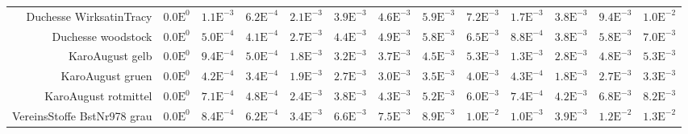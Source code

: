 \begin{landscape}
\begin{table}
\begin{tabularx}{\linewidth}{r | rr | rrrrrr | rrrr}
        Duchesse WirksatinTracy & \footnotesize{$0.0\mathrm{E}^{0}$}& \footnotesize{$1.1\mathrm{E}^{-3}$}& \footnotesize{$6.2\mathrm{E}^{-4}$}& \footnotesize{$2.1\mathrm{E}^{-3}$}& \footnotesize{$3.9\mathrm{E}^{-3}$}& \footnotesize{$4.6\mathrm{E}^{-3}$}& \footnotesize{$5.9\mathrm{E}^{-3}$}& \footnotesize{$7.2\mathrm{E}^{-3}$}& \footnotesize{$1.7\mathrm{E}^{-3}$}& \footnotesize{$3.8\mathrm{E}^{-3}$}& \footnotesize{$9.4\mathrm{E}^{-3}$}& \footnotesize{$1.0\mathrm{E}^{-2}$}\\
        Duchesse woodstock & \footnotesize{$0.0\mathrm{E}^{0}$}& \footnotesize{$5.0\mathrm{E}^{-4}$}& \footnotesize{$4.1\mathrm{E}^{-4}$}& \footnotesize{$2.7\mathrm{E}^{-3}$}& \footnotesize{$4.4\mathrm{E}^{-3}$}& \footnotesize{$4.9\mathrm{E}^{-3}$}& \footnotesize{$5.8\mathrm{E}^{-3}$}& \footnotesize{$6.5\mathrm{E}^{-3}$}& \footnotesize{$8.8\mathrm{E}^{-4}$}& \footnotesize{$3.8\mathrm{E}^{-3}$}& \footnotesize{$5.8\mathrm{E}^{-3}$}& \footnotesize{$7.0\mathrm{E}^{-3}$}\\
        KaroAugust gelb & \footnotesize{$0.0\mathrm{E}^{0}$}& \footnotesize{$9.4\mathrm{E}^{-4}$}& \footnotesize{$5.0\mathrm{E}^{-4}$}& \footnotesize{$1.8\mathrm{E}^{-3}$}& \footnotesize{$3.2\mathrm{E}^{-3}$}& \footnotesize{$3.7\mathrm{E}^{-3}$}& \footnotesize{$4.5\mathrm{E}^{-3}$}& \footnotesize{$5.3\mathrm{E}^{-3}$}& \footnotesize{$1.3\mathrm{E}^{-3}$}& \footnotesize{$2.8\mathrm{E}^{-3}$}& \footnotesize{$4.8\mathrm{E}^{-3}$}& \footnotesize{$5.3\mathrm{E}^{-3}$}\\
        KaroAugust gruen & \footnotesize{$0.0\mathrm{E}^{0}$}& \footnotesize{$4.2\mathrm{E}^{-4}$}& \footnotesize{$3.4\mathrm{E}^{-4}$}& \footnotesize{$1.9\mathrm{E}^{-3}$}& \footnotesize{$2.7\mathrm{E}^{-3}$}& \footnotesize{$3.0\mathrm{E}^{-3}$}& \footnotesize{$3.5\mathrm{E}^{-3}$}& \footnotesize{$4.0\mathrm{E}^{-3}$}& \footnotesize{$4.3\mathrm{E}^{-4}$}& \footnotesize{$1.8\mathrm{E}^{-3}$}& \footnotesize{$2.7\mathrm{E}^{-3}$}& \footnotesize{$3.3\mathrm{E}^{-3}$}\\
        KaroAugust rotmittel & \footnotesize{$0.0\mathrm{E}^{0}$}& \footnotesize{$7.1\mathrm{E}^{-4}$}& \footnotesize{$4.8\mathrm{E}^{-4}$}& \footnotesize{$2.4\mathrm{E}^{-3}$}& \footnotesize{$3.8\mathrm{E}^{-3}$}& \footnotesize{$4.3\mathrm{E}^{-3}$}& \footnotesize{$5.2\mathrm{E}^{-3}$}& \footnotesize{$6.0\mathrm{E}^{-3}$}& \footnotesize{$7.4\mathrm{E}^{-4}$}& \footnotesize{$4.2\mathrm{E}^{-3}$}& \footnotesize{$6.8\mathrm{E}^{-3}$}& \footnotesize{$8.2\mathrm{E}^{-3}$}\\
        VereinsStoffe BstNr978 grau & \footnotesize{$0.0\mathrm{E}^{0}$}& \footnotesize{$8.4\mathrm{E}^{-4}$}& \footnotesize{$6.2\mathrm{E}^{-4}$}& \footnotesize{$3.4\mathrm{E}^{-3}$}& \footnotesize{$6.6\mathrm{E}^{-3}$}& \footnotesize{$7.5\mathrm{E}^{-3}$}& \footnotesize{$8.9\mathrm{E}^{-3}$}& \footnotesize{$1.0\mathrm{E}^{-2}$}& \footnotesize{$1.0\mathrm{E}^{-3}$}& \footnotesize{$3.9\mathrm{E}^{-3}$}& \footnotesize{$1.2\mathrm{E}^{-2}$}& \footnotesize{$1.3\mathrm{E}^{-2}$}\\

\end{tabularx}
\end{table}
\end{landscape}
